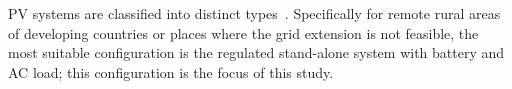 \documentclass[review]{elsarticle}
\begin{document}
PV systems are classified into distinct types~\cite{Mohanty}. %
%
Specifically for remote rural areas of developing countries or places where the grid extension is not feasible, 
the most suitable configuration is the regulated stand-alone system with battery and AC load; this configuration is the focus of this study.
\end{document}
